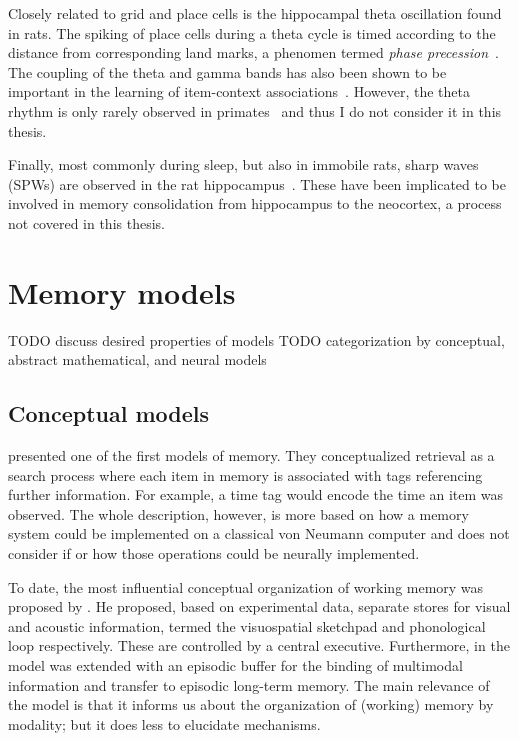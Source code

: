 Closely related to grid and place cells is the hippocampal theta oscillation found in rats.
The spiking of place cells during a theta cycle is timed according to the distance from corresponding land marks, a phenomen termed \emph{phase precession}~\parencite{tsodyks1996}.
The coupling of the theta and gamma bands has also been shown to be important in the learning of item-context associations~\parencite{tort2009}.
However, the theta rhythm is only rarely observed in primates~\parencite{ekstrom2005} and thus I do not consider it in this thesis.

Finally, most commonly during sleep, but also in immobile rats, sharp waves (SPWs) are observed in the rat hippocampus~\parencite{chrobak1994,girardeau2009}.
These have been implicated to be involved in memory consolidation from hippocampus to the neocortex, a process not covered in this thesis.


\section{Memory models}
TODO discuss desired properties of models
TODO categorization by conceptual, abstract mathematical, and neural models

\subsection{Conceptual models}
\Textcite{Yntema1963} presented one of the first models of memory.
They conceptualized retrieval as a search process where each item in memory is associated with tags referencing further information.
For example, a time tag would encode the time an item was observed.
The whole description, however, is more based on how a memory system could be implemented on a classical von Neumann computer and does not consider if or how those operations could be neurally implemented.

To date, the most influential conceptual organization of working memory was proposed by \textcite{Baddeley1986}.
He proposed, based on experimental data, separate stores for visual and acoustic information, termed the visuospatial sketchpad and phonological loop respectively.
These are controlled by a central executive.
Furthermore, in \textcite{Baddeley2000} the model was extended with an episodic buffer for the binding of multimodal information and transfer to episodic long-term memory.
The main relevance of the model is that it informs us about the organization of (working) memory by modality; but it does less to elucidate mechanisms.

